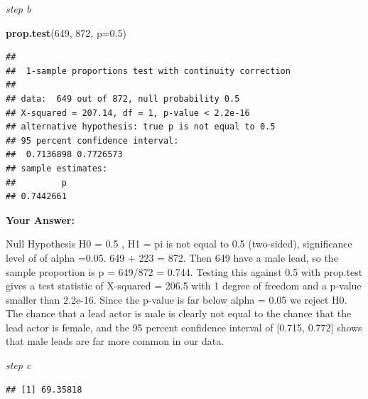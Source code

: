 \documentclass[
]{article}
\newenvironment{Shaded}{\begin{snugshade}}{\end{snugshade}}
\newcommand{\AttributeTok}[1]{\textcolor[rgb]{0.13,0.29,0.53}{#1}}
\newcommand{\ConstantTok}[1]{\textcolor[rgb]{0.56,0.35,0.01}{#1}}
\newcommand{\DecValTok}[1]{\textcolor[rgb]{0.00,0.00,0.81}{#1}}
\newcommand{\FloatTok}[1]{\textcolor[rgb]{0.00,0.00,0.81}{#1}}
\newcommand{\FunctionTok}[1]{\textcolor[rgb]{0.13,0.29,0.53}{\textbf{#1}}}
\newcommand{\NormalTok}[1]{#1}
\newcommand{\SpecialCharTok}[1]{\textcolor[rgb]{0.81,0.36,0.00}{\textbf{#1}}}
\newcommand{\StringTok}[1]{\textcolor[rgb]{0.31,0.60,0.02}{#1}}
\begin{document}
\emph{step b}

\begin{Shaded}
\begin{Highlighting}[]
\FunctionTok{prop.test}\NormalTok{(}\DecValTok{649}\NormalTok{, }\DecValTok{872}\NormalTok{, }\AttributeTok{p=}\FloatTok{0.5}\NormalTok{) }
\end{Highlighting}
\end{Shaded}

\begin{verbatim}
## 
##  1-sample proportions test with continuity correction
## 
## data:  649 out of 872, null probability 0.5
## X-squared = 207.14, df = 1, p-value < 2.2e-16
## alternative hypothesis: true p is not equal to 0.5
## 95 percent confidence interval:
##  0.7136898 0.7726573
## sample estimates:
##         p 
## 0.7442661
\end{verbatim}

\textbf{Your Answer:}

Null Hypothesis H0 = 0.5 , H1 = pi is not equal to 0.5 (two-sided),
significance level of of alpha =0.05. 649 + 223 = 872. Then 649 have a
male lead, so the sample proportion is p = 649/872 = 0.744. Testing this
against 0.5 with prop.test gives a test statistic of X-squared = 206.5
with 1 degree of freedom and a p-value smaller than 2.2e-16. Since the
p-value is far below alpha = 0.05 we reject H0. The chance that a lead
actor is male is clearly not equal to the chance that the lead actor is
female, and the 95 percent confidence interval of {[}0.715, 0.772{]}
shows that male leads are far more common in our data.

\emph{step c}

\begin{Shaded}
\end{Shaded}

\begin{verbatim}
## [1] 69.35818
\end{verbatim}

\begin{Shaded}
\end{Shaded}
\end{document}
